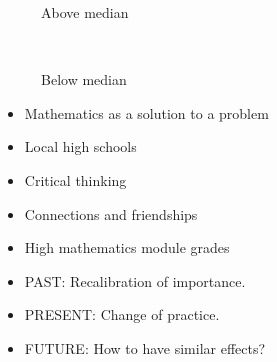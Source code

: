 \documentclass{beamer}
\begin{document}
    \begin{frame}
        \begin{table}[!hbtp]
            \tiny
            \centering

            \begin{subfigure}[t]{.5\textwidth}
                \centering
                
                \caption{Above
                median}
            \end{subfigure}%
            ~
            \begin{subfigure}[t]{.5\textwidth}
                \centering
                
                \caption{Below
                median}
            \end{subfigure}%
        \end{table}
    \end{frame}

    \begin{frame}
        \begin{itemize}
            \setlength\itemsep{1em}
            \item Mathematics as a solution to a problem
            \item Local high schools
            \item Critical thinking
            \item Connections and friendships
            \item High mathematics module grades
        \end{itemize}
    \end{frame}

    \begin{frame}
        \begin{itemize}
            \setlength\itemsep{1em}
            \item PAST: Recalibration of importance.
            \item PRESENT: Change of practice.
            \item FUTURE: How to have similar effects?
        \end{itemize}
    \end{frame}
\end{document}
